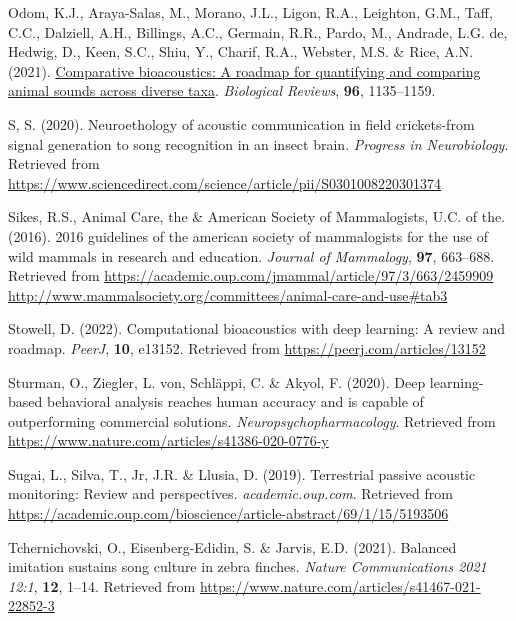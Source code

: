 \documentclass[
]{article}
\newlength{\cslhangindent}
\newlength{\cslentryspacingunit} %
\newenvironment{CSLReferences}[2] %
 {%
  \setlength{\parindent}{0pt}
  \ifodd #1
  \let\oldpar\par
  \def\par{\hangindent=\cslhangindent\oldpar}
  \fi
  \setlength{\parskip}{#2\cslentryspacingunit}
 }%
 {}
\begin{document}
\begin{CSLReferences}{1}{0}
\leavevmode{}%
Odom, K.J., Araya-Salas, M., Morano, J.L., Ligon, R.A., Leighton, G.M.,
Taff, C.C., Dalziell, A.H., Billings, A.C., Germain, R.R., Pardo, M.,
Andrade, L.G. de, Hedwig, D., Keen, S.C., Shiu, Y., Charif, R.A.,
Webster, M.S. \& Rice, A.N. (2021).
\href{https://doi.org/10.1111/brv.12695}{Comparative bioacoustics: A
roadmap for quantifying and comparing animal sounds across diverse
taxa}. \emph{Biological Reviews}, \textbf{96}, 1135--1159.

\leavevmode{}%
S, S. (2020). Neuroethology of acoustic communication in field
crickets-from signal generation to song recognition in an insect brain.
\emph{Progress in Neurobiology}. Retrieved from
\url{https://www.sciencedirect.com/science/article/pii/S0301008220301374}

\leavevmode{}%
Sikes, R.S., Animal Care, the \& American Society of Mammalogists, U.C.
of the. (2016). 2016 guidelines of the american society of mammalogists
for the use of wild mammals in research and education. \emph{Journal of
Mammalogy}, \textbf{97}, 663--688. Retrieved from
\href{https://academic.oup.com/jmammal/article/97/3/663/2459909\%20http://www.mammalsociety.org/committees/animal-care-and-use\#tab3}{https://academic.oup.com/jmammal/article/97/3/663/2459909
http://www.mammalsociety.org/committees/animal-care-and-use\#tab3}

\leavevmode{}%
Stowell, D. (2022). Computational bioacoustics with deep learning: A
review and roadmap. \emph{PeerJ}, \textbf{10}, e13152. Retrieved from
\url{https://peerj.com/articles/13152}

\leavevmode{}%
Sturman, O., Ziegler, L. von, Schläppi, C. \& Akyol, F. (2020). Deep
learning-based behavioral analysis reaches human accuracy and is capable
of outperforming commercial solutions. \emph{Neuropsychopharmacology}.
Retrieved from \url{https://www.nature.com/articles/s41386-020-0776-y}

\leavevmode{}%
Sugai, L., Silva, T., Jr, J.R. \& Llusia, D. (2019). Terrestrial passive
acoustic monitoring: Review and perspectives. \emph{academic.oup.com}.
Retrieved from
\url{https://academic.oup.com/bioscience/article-abstract/69/1/15/5193506}

\leavevmode{}%
Tchernichovski, O., Eisenberg-Edidin, S. \& Jarvis, E.D. (2021).
Balanced imitation sustains song culture in zebra finches. \emph{Nature
Communications 2021 12:1}, \textbf{12}, 1--14. Retrieved from
\url{https://www.nature.com/articles/s41467-021-22852-3}


\end{CSLReferences}
\end{document}
